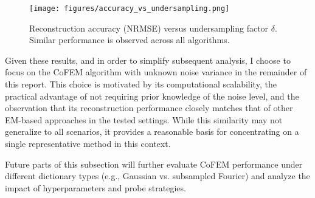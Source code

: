 \documentclass{article}
\begin{document}
\begin{figure}[h]
    \centering
    \texttt{[image: figures/accuracy\_vs\_undersampling.png]}
    \caption{Reconstruction accuracy (NRMSE) versus undersampling factor $ \delta $. Similar performance is observed across all algorithms.}
    \label{fig:accuracy_vs_undersampling}
\end{figure}


Given these results, and in order to simplify subsequent analysis, I choose to focus on the CoFEM algorithm with unknown noise variance in the remainder of this report. This choice is motivated by its computational scalability, the practical advantage of not requiring prior knowledge of the noise level, and the observation that its reconstruction performance closely matches that of other EM-based approaches in the tested settings. While this similarity may not generalize to all scenarios, it provides a reasonable basis for concentrating on a single representative method in this context.

Future parts of this subsection will further evaluate CoFEM performance under different dictionary types (e.g., Gaussian vs. subsampled Fourier) and analyze the impact of hyperparameters and probe strategies.

    
\end{document}
